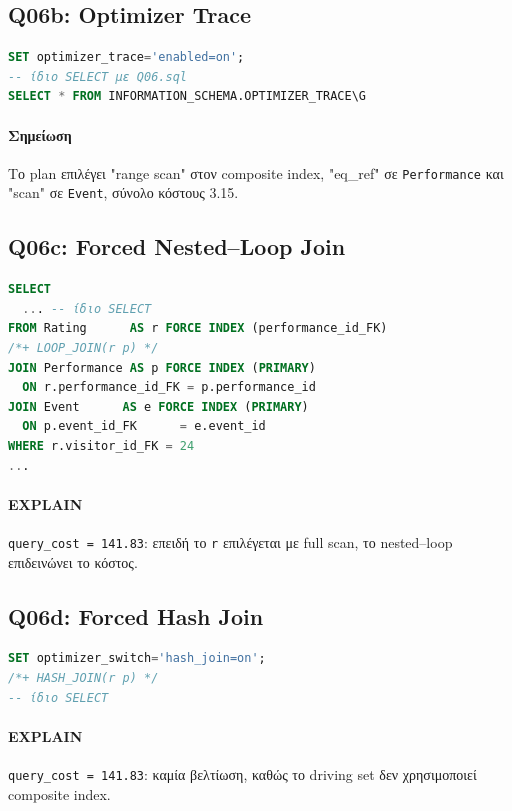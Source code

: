 \documentclass[a4paper,12pt]{article}
\begin{document}
\subsection{Q06b: Optimizer Trace}
\begin{lstlisting}[language=SQL]
SET optimizer_trace='enabled=on';
-- ίδιο SELECT με Q06.sql
SELECT * FROM INFORMATION_SCHEMA.OPTIMIZER_TRACE\G
\end{lstlisting}

\paragraph{Σημείωση}
Το plan επιλέγει "range scan" στον composite index, "eq\_ref" σε \texttt{Performance} και "scan" σε \texttt{Event}, σύνολο κόστους 3.15.

\subsection{Q06c: Forced Nested–Loop Join}
\begin{lstlisting}[language=SQL]
SELECT
  ... -- ίδιο SELECT
FROM Rating      AS r FORCE INDEX (performance_id_FK)
/*+ LOOP_JOIN(r p) */
JOIN Performance AS p FORCE INDEX (PRIMARY)
  ON r.performance_id_FK = p.performance_id
JOIN Event      AS e FORCE INDEX (PRIMARY)
  ON p.event_id_FK      = e.event_id
WHERE r.visitor_id_FK = 24
...
\end{lstlisting}

\paragraph{EXPLAIN}  
\texttt{query\_cost = 141.83}: επειδή το \texttt{r} επιλέγεται με full scan, το nested–loop επιδεινώνει το κόστος.

\subsection{Q06d: Forced Hash Join}
\begin{lstlisting}[language=SQL]
SET optimizer_switch='hash_join=on';
/*+ HASH_JOIN(r p) */
-- ίδιο SELECT
\end{lstlisting}

\paragraph{EXPLAIN}  
\texttt{query\_cost = 141.83}: καμία βελτίωση, καθώς το driving set δεν χρησιμοποιεί composite index.
\end{document}
